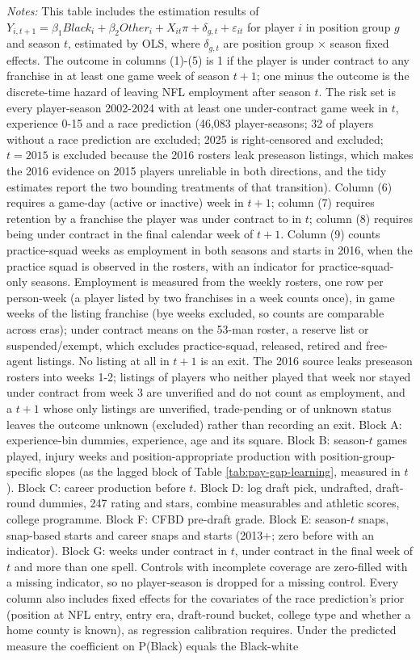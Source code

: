 {\footnotesize
\noindent\textit{Notes:} This table includes the estimation results of $Y_{i,t+1} = \beta_1 Black_i + \beta_2 Other_i + X_{it}\pi + \delta_{g,t} + \varepsilon_{it}$ for player $i$ in position group $g$ and season $t$, estimated by OLS, where $\delta_{g,t}$ are position group $\times$ season fixed effects. The outcome in columns (1)-(5) is 1 if the player is under contract to any franchise in at least one game week of season $t+1$; one minus the outcome is the discrete-time hazard of leaving NFL employment after season $t$. The risk set is every player-season 2002-2024 with at least one under-contract game week in $t$, experience 0-15 and a race prediction (46,083 player-seasons; 32 of players without a race prediction are excluded; 2025 is right-censored and excluded; $t = 2015$ is excluded because the 2016 rosters leak preseason listings, which makes the 2016 evidence on 2015 players unreliable in both directions, and the tidy estimates report the two bounding treatments of that transition). Column (6) requires a game-day (active or inactive) week in $t+1$; column (7) requires retention by a franchise the player was under contract to in $t$; column (8) requires being under contract in the final calendar week of $t+1$. Column (9) counts practice-squad weeks as employment in both seasons and starts in 2016, when the practice squad is observed in the rosters, with an indicator for practice-squad-only seasons. Employment is measured from the weekly rosters, one row per person-week (a player listed by two franchises in a week counts once), in game weeks of the listing franchise (bye weeks excluded, so counts are comparable across eras); under contract means on the 53-man roster, a reserve list or suspended/exempt, which excludes practice-squad, released, retired and free-agent listings. No listing at all in $t+1$ is an exit. The 2016 source leaks preseason rosters into weeks 1-2; listings of players who neither played that week nor stayed under contract from week 3 are unverified and do not count as employment, and a $t+1$ whose only listings are unverified, trade-pending or of unknown status leaves the outcome unknown (excluded) rather than recording an exit. Block A: experience-bin dummies, experience, age and its square. Block B: season-$t$ games played, injury weeks and position-appropriate production with position-group-specific slopes (as the lagged block of Table \ref{tab:pay-gap-learning}, measured in $t$). Block C: career production before $t$. Block D: log draft pick, undrafted, draft-round dummies, 247 rating and stars, combine measurables and athletic scores, college programme. Block F: CFBD pre-draft grade. Block E: season-$t$ snaps, snap-based starts and career snaps and starts (2013+; zero before with an indicator). Block G: weeks under contract in $t$, under contract in the final week of $t$ and more than one spell. Controls with incomplete coverage are zero-filled with a missing indicator, so no player-season is dropped for a missing control. Every column also includes fixed effects for the covariates of the race prediction's prior (position at NFL entry, entry era, draft-round bucket, college type and whether a home county is known), as regression calibration requires. Under the predicted measure the coefficient on P(Black) equals the Black-white }
